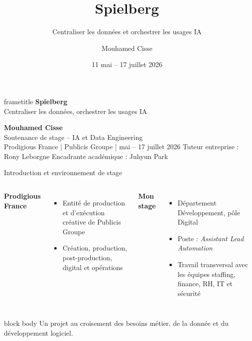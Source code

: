 \documentclass[aspectratio=169,11pt,french]{beamer}
\title{Spielberg}
\subtitle{Centraliser les données et orchestrer les usages IA}
\author{Mouhamed Cisse}
\institute{Prodigious France -- Publicis Groupe}
\date{11 mai -- 17 juillet 2026}
\begin{document}
\begin{frame}[plain]
  \vspace*{1.05cm}
  \begin{beamercolorbox}[wd=\paperwidth,sep=.55cm,leftskip=.8cm]{frametitle}
    {\color{white}\fontsize{30}{34}\selectfont\bfseries Spielberg}\\[.18cm]
    {\color{white}\Large Centraliser les données, orchestrer les usages IA}
  \end{beamercolorbox}
  \vspace{.8cm}
  {\LARGE\bfseries Mouhamed Cisse}\\[.35cm]
  {\large Soutenance de stage -- IA et Data Engineering}\\[.5cm]
  {\normalsize Prodigious France \quad | \quad Publicis Groupe \quad |  mai -- 17 juillet 2026}
  \vfill
  {\small\color{StageGrey}Tuteur entreprise : Rony Leborgne
    \hfill Encadrante académique : Juhyun Park}
\end{frame}

\begin{frame}{Introduction et environnement de stage}
  \vspace{.35cm}
  \begin{columns}[T,onlytextwidth]
      {\Large\bfseries Prodigious France}\\[.25cm]
      \begin{itemize}
        \item Entité de production et d'exécution créative de Publicis Groupe
        \item Création, production, post-production, digital et opérations
      \end{itemize}
      {\Large\bfseries Mon stage}\\[.25cm]
      \begin{itemize}
        \item Département Développement, pôle Digital
        \item Poste : \textit{Assistant Lead Automation}
        \item Travail transversal avec les équipes staffing, finance, RH, IT et sécurité
      \end{itemize}
  \end{columns}
  \vfill
  \begin{beamercolorbox}[wd=\linewidth,sep=.4cm,rounded=true]{block body}
    \centering\large
    Un projet au croisement des besoins métier, de la donnée et du développement logiciel.
  \end{beamercolorbox}
\end{frame}
\end{document}
